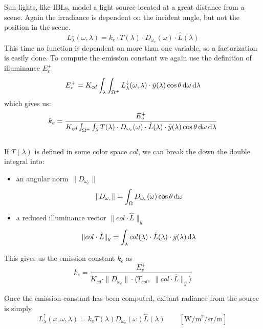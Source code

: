 Sun lights, like \glspl{IBL}, model a light source located at a great distance from
a scene. Again the irradiance is dependent on the incident angle, but not the
position in the scene.
\begin{equation}
L^\downarrow_{\lambda}(\omega,\lambda) = k_e\cdot T(\lambda)\cdot
D_{\omega_c}(\omega)\cdot \hat{L}(\lambda)
\end{equation}
This time no function is dependent on more than one variable, so a factorization is easily done.
To compute the emission constant we again use the definition of illuminance
$E^+_v$
\begin{equation}
E^+_v = K_{cd} \int_\lambda \int_{\Omega^+} L^\downarrow_{\lambda}(\omega,\lambda) \cdot\bar y(\lambda)\cos\theta\mathop{}\!\mathrm{d}\omega \mathop{}\!\mathrm{d}\lambda
\end{equation}
which gives us:
\begin{equation}
k_e = \frac{E^+_v}{K_{cd}\int_{\Omega^+}\int_{\lambda} T(\lambda)\cdot D_{\omega_c}(\omega)\cdot \hat{L}(\lambda) \cdot \bar y(\lambda)\cos\theta\mathop{}\!\mathrm{d}\omega \mathop{}\!\mathrm{d}\lambda}
\end{equation}
\\
If $T(\lambda)$ is defined in some color space $col$, we can break the down the double integral into:
\begin{itemize}
\item an angular norm $\|D_{\omega_c}\|$
\begin{equation}
\|D_{\omega_c}\| = \int_\Omega D_{\omega_c}(\omega)\cos\theta\mathop{}\!\mathrm{d}\omega
\end{equation}
\item a reduced illuminance vector $\|col \cdot \hat{L}\|_{\bar{y}}$
\begin{equation}
\|col \cdot \hat{L}\|_{\bar{y}} = \int_\lambda col(\lambda)\cdot \hat{L}(\lambda)\cdot\bar{y}(\lambda)\mathop{}\!\mathrm{d}\lambda
\end{equation}
\end{itemize}
This gives us the emission constant $k_e$ as
\begin{equation}
k_e = \frac{E^+_v}{K_{cd}\cdot \|D_{\omega_c}\|\cdot \big\langle T_{col}, \; \|col \cdot \hat{L}\|_{\bar{y}} \big\rangle}
\end{equation}

Once the emission constant has been computed, exitant radiance from the source
is simply
\begin{equation}
L^\uparrow_{\lambda}(x, \omega, \lambda) = k_e  T(\lambda)
D_{\omega_c}(\omega) \hat{L}(\lambda)
\qquad \left[\unit{\watt\per\square\meter\per\steradian\per\meter}\right]
\end{equation}

